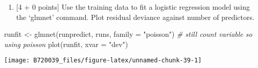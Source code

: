 \documentclass[
]{article}
\newenvironment{Shaded}{\begin{snugshade}}{\end{snugshade}}
\newcommand{\AttributeTok}[1]{\textcolor[rgb]{0.77,0.63,0.00}{#1}}
\newcommand{\CommentTok}[1]{\textcolor[rgb]{0.56,0.35,0.01}{\textit{#1}}}
\newcommand{\DecValTok}[1]{\textcolor[rgb]{0.00,0.00,0.81}{#1}}
\newcommand{\FloatTok}[1]{\textcolor[rgb]{0.00,0.00,0.81}{#1}}
\newcommand{\FunctionTok}[1]{\textcolor[rgb]{0.00,0.00,0.00}{#1}}
\newcommand{\NormalTok}[1]{#1}
\newcommand{\OtherTok}[1]{\textcolor[rgb]{0.56,0.35,0.01}{#1}}
\newcommand{\SpecialCharTok}[1]{\textcolor[rgb]{0.00,0.00,0.00}{#1}}
\newcommand{\StringTok}[1]{\textcolor[rgb]{0.31,0.60,0.02}{#1}}
\providecommand{\tightlist}{%
  \setlength{\itemsep}{0pt}\setlength{\parskip}{0pt}}
\begin{document}
\begin{Shaded}
\end{Shaded}

\begin{enumerate}
\def\labelenumi{\alph{enumi}.}
\setcounter{enumi}{1}
\tightlist
\item
  {[}4 + 0 points{]} Use the training data to fit a logistic regression
  model using the `glmnet' command. Plot residual deviance against
  number of predictors.
\end{enumerate}

\begin{Shaded}
\end{Shaded}

\begin{Shaded}
\begin{Highlighting}[]
\NormalTok{runfit }\OtherTok{\textless{}{-}} \FunctionTok{glmnet}\NormalTok{(runpredict, runs, }\AttributeTok{family =} \StringTok{"poisson"}\NormalTok{) }\CommentTok{\# still count variable so using poisson}
\FunctionTok{plot}\NormalTok{(runfit, }\AttributeTok{xvar =} \StringTok{"dev"}\NormalTok{)}
\end{Highlighting}
\end{Shaded}

\begin{center}\texttt{[image: B720039\_files/figure-latex/unnamed-chunk-39-1]} \end{center}
\end{document}
